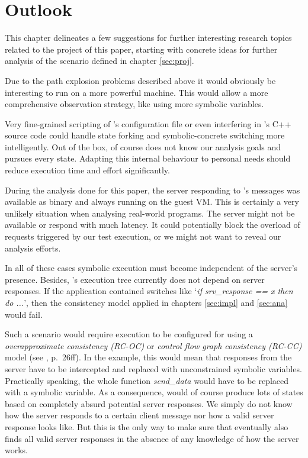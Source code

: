 \section{Outlook}\label{sec:outlook}

This chapter delineates a few suggestions for further interesting research topics related to the project of this paper, starting with concrete ideas for further analysis of the scenario defined in chapter \ref{sec:proj}.

\medskip
Due to the path explosion problems described above it would obviously be interesting to run \sse on a more powerful machine.
This would allow a more comprehensive observation strategy, like using more symbolic variables.

\medskip
Very fine-grained scripting of \sse's configuration file or even interfering in \sse's C++ source code could handle state forking and symbolic-concrete switching more intelligently.
Out of the box, \sse of course does not know our analysis goals and pursues every state.
Adapting this internal behaviour to personal needs should reduce execution time and effort significantly.

\medskip
During the analysis done for this paper, the server responding to \app's messages was available as binary and always running on the guest VM.
This is certainly a very unlikely situation when analysing real-world programs.
The server might not be available or respond with much latency.
It could potentially block the overload of requests triggered by our test execution, or we might not want to reveal our analysis efforts.

In all of these cases symbolic execution must become independent of the server's presence.
Besides, \app's execution tree currently does not depend on server responses.
If the application contained switches like `\textit{if srv\_response == x then do ...}', then the consistency model applied in chapters \ref{sec:impl} and \ref{sec:ana} would fail.

Such a scenario would require \sse execution to be configured for using a \textit{overapproximate consistency (RC-OC)} or \textit{control flow graph consistency (RC-CC)} model (see \cite{chip14s2e}, p.~26ff).
In the \app example, this would mean that responses from the server have to be intercepted and replaced with unconstrained symbolic variables.
Practically speaking, the whole function \textit{send\_data} would have to be replaced with a symbolic variable.
As a consequence, \sse would of course produce lots of states based on completely absurd potential server responses.
We simply do not know how the server responds to a certain client message nor how a valid server response looks like.
But this is the only way to make sure that \sse eventually also finds all valid server responses in the absence of any knowledge of how the server works. 



